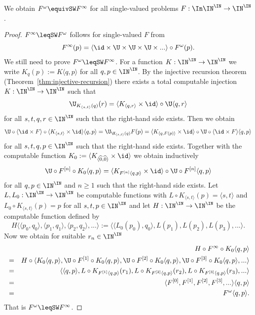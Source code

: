 \begin{prop}
\label{prop:inverse-omega}
We obtain $F^\omega\equivSW F^\infty$ for all single-valued problems $F:\In\IN^\IN\to\IN^\IN$.
\end{prop}
\begin{proof}
$F^\infty\leqSW F^\omega$ follows for single-valued $F$ from
\[F^\infty(p)=\langle\id\times\U\times\U\times\U\times...\rangle\circ F^\omega(p).\]
We still need to prove $F^\omega\leqSW F^\infty$. 
For a function $K:\IN^\IN\to\IN^\IN$ we write $K_q(p):=K\langle q,p\rangle$ for all $q,p\in\IN^\IN$.
By the injective recursion theorem (Theorem~\ref{thm:injective-recursion}) there exists a total computable injection
$K:\IN^\IN\to\IN^\IN$ such that
\[\U_{K_{\langle s,t\rangle}(q)}(r)=\langle K_{\langle q,r\rangle}\times\id\rangle\circ\U\langle q,r\rangle\]
for all $s,t,q,r\in\IN^\IN$ such that the right-hand side exists.
Then we obtain
\[\U\circ\langle\id\times F\rangle\circ \langle K_{\langle s,t\rangle}\times\id\rangle\langle q,p\rangle
=\U_{\K_{\langle s,t\rangle}(q)}F(p)=\langle K_{\langle q,F(p)\rangle}\times\id\rangle\circ\U\circ\langle \id\times F\rangle\langle q,p\rangle\]
for all $s,t,q,p\in\IN^\IN$ such that the right-hand side exists. 
Together with the computable function $K_0:=\langle K_{\langle\widehat{0},\widehat{0}\rangle}\times\id\rangle$
we obtain inductively
\[\U\circ F^{[n]}\circ K_0\langle q,p\rangle=\langle K_{F^{[n]}\langle q,p\rangle}\times\id\rangle\circ\U\circ F^{[n]}\langle q,p\rangle\]
for all $q,p\in\IN^\IN$ and $n\geq1$ such that the right-hand side exists.
Let $L,L_0:\IN^\IN\to\IN^\IN$ be computable functions with $L\circ K_{\langle s,t\rangle}(p)=\langle s,t\rangle$ 
and $L_0\circ K_{\langle s,t\rangle}(p)=p$ for all
$s,t,p\in\IN^\IN$ and let $H:\IN^\IN\to\IN^\IN$ be the computable function defined by
\[H\langle\langle p_0,q_0\rangle,\langle p_1,q_1\rangle,\langle p_2,q_2\rangle,...\rangle:=\langle \langle L_0(p_0),q_0\rangle,L(p_1),L(p_2),L(p_3),...\rangle.\]
Now we obtain for suitable $r_n\in\IN^\IN$
\begin{eqnarray*}
&&H\circ F^\infty\circ K_0\langle q,p\rangle\\
&=& H\circ\langle K_0\langle q,p\rangle,\U\circ F^{[1]}\circ K_0\langle q,p\rangle,\U\circ F^{[2]}\circ K_0\langle q,p\rangle,\U\circ F^{[3]}\circ K_0\langle q,p\rangle,...\rangle\\
 &=& \langle \langle q,p\rangle,L\circ K_{F^{[1]}\langle q,p\rangle}(r_1),L\circ K_{F^{[2]}\langle q,p\rangle}(r_2),L\circ K_{F^{[3]}\langle q,p\rangle}(r_3),...\rangle\\
 &=& \langle F^{[0]},F^{[1]},F^{[2]},F^{[3]},...\rangle\langle q,p\rangle\\
 &=& F^\omega\langle q,p\rangle.
\end{eqnarray*}
That is $F^\omega\leqSW F^\infty$.
\end{proof}

